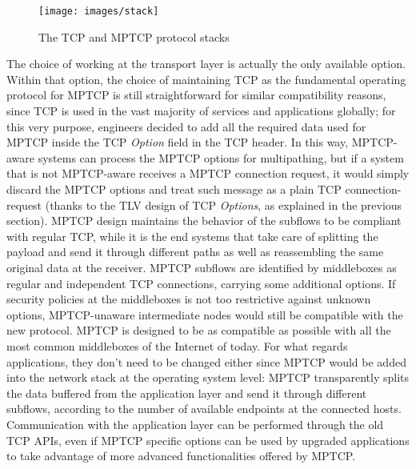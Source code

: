 \begin{figure}[!htb]
\centering
\texttt{[image: images/stack]}
\caption{The TCP and MPTCP protocol stacks}
\label{fig:stack}
\end{figure}

The choice of working at the transport layer is actually the only available option. Within that option, the choice of maintaining TCP as the fundamental operating protocol for MPTCP is still straightforward for similar compatibility reasons, since TCP is used in the vast majority of services and applications globally; for this very purpose, engineers decided to add all the required data used for MPTCP inside the TCP \textit{Option} field in the TCP header. In this way, MPTCP-aware systems can process the MPTCP options for multipathing, but if a system that is not MPTCP-aware receives a MPTCP connection request, it would simply discard the MPTCP options and treat such message as a plain TCP connection-request (thanks to the TLV design of TCP \textit{Options}, as explained in the previous section). 
MPTCP design maintains the behavior of the subflows to be compliant with regular TCP, while it is the end systems that take care of splitting the payload and send it through different paths as well as reassembling the same original data at the receiver. MPTCP subflows are identified by middleboxes as regular and independent TCP connections, carrying some additional options. If security policies at the middleboxes is not too restrictive against unknown options, MPTCP-unaware intermediate nodes would still be compatible with the new protocol. MPTCP is designed to be as compatible as possible with all the most common middleboxes of the Internet of today.
For what regards applications, they don't need to be changed either since MPTCP would be added into the network stack at the operating system level: MPTCP transparently splits the data buffered from the application layer and send it through different subflows, according to the number of available endpoints at the connected hosts. Communication with the application layer can be performed through the old TCP APIs, even if MPTCP specific options can be used by upgraded applications to take advantage of more advanced functionalities offered by MPTCP.

